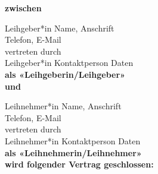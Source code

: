 \documentclass[article, 11pt,a4paper, titlepage, parskip=half, bibliography=totocnumbered]{scrreprt}
\def\GeberNameAnschrift{Leihgeber*in Name, Anschrift}
\def\GeberKontaktAllgemein{Telefon, E-Mail}
\def\GeberKontaktPerson{Leihgeber*in Kontaktperson Daten}
\def\NehmerNameAnschrift{Leihnehmer*in Name, Anschrift}
\def\NehmerKontaktAllgemein{Telefon, E-Mail}
\def\NehmerKontaktPerson{Leihnehmer*in Kontaktperson Daten}
\begin{document}
	\setcounter{page}{1}
	\thispagestyle{fancy}
	
	\textbf{zwischen}
	
	\GeberNameAnschrift \\
	\GeberKontaktAllgemein \\
	vertreten durch \\
	\GeberKontaktPerson \\
		
	\textbf{als «Leihgeberin/Leihgeber»} \\
	
	\textbf{und}
	
	\NehmerNameAnschrift \\
	\NehmerKontaktAllgemein \\
	vertreten durch \\
	\NehmerKontaktPerson \\
	
	\textbf{als «Leihnehmerin/Leihnehmer»} \\
	
	\textbf{wird folgender Vertrag geschlossen:}
	
\end{document}
